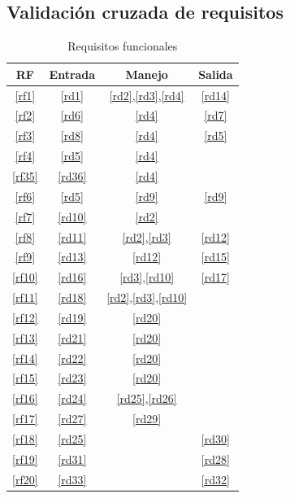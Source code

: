 \documentclass[12pt,a4paper]{article}
\begin{document}
\subsection{Validación cruzada de requisitos}
\begin{table}[H]
\begin{center}
\begin{tabular}{|c|c|c|c|}
\hline
	RF & Entrada & Manejo & Salida\\
\hline
	\ref{rf1} & \ref{rd1} & \ref{rd2},\ref{rd3},\ref{rd4} & \ref{rd14}\\
\hline
	\ref{rf2} & \ref{rd6} & \ref{rd4} & \ref{rd7}\\
\hline
	\ref{rf3} & \ref{rd8} & \ref{rd4} & \ref{rd5}\\
\hline
	\ref{rf4} & \ref{rd5} & \ref{rd4} & \\
\hline
	\ref{rf35} & \ref{rd36} & \ref{rd4} & \\
\hline
	\ref{rf6} & \ref{rd5} & \ref{rd9} & \ref{rd9}\\
\hline
	\ref{rf7} & \ref{rd10} & \ref{rd2} & \\
\hline
	\ref{rf8} & \ref{rd11} & \ref{rd2},\ref{rd3} & \ref{rd12}\\
\hline
	\ref{rf9} & \ref{rd13} & \ref{rd12} & \ref{rd15}\\
\hline
	\ref{rf10} & \ref{rd16} & \ref{rd3},\ref{rd10} & \ref{rd17}\\
\hline
	\ref{rf11} & \ref{rd18} & \ref{rd2},\ref{rd3},\ref{rd10} & \\
\hline
	\ref{rf12} & \ref{rd19} & \ref{rd20} & \\
\hline
	\ref{rf13} & \ref{rd21} & \ref{rd20} & \\
\hline
	\ref{rf14} & \ref{rd22} & \ref{rd20} & \\
\hline
	\ref{rf15} & \ref{rd23} & \ref{rd20} & \\
\hline
	\ref{rf16} & \ref{rd24} & \ref{rd25},\ref{rd26} & \\
\hline
	\ref{rf17} & \ref{rd27} & \ref{rd29} & \\
\hline
	\ref{rf18} & \ref{rd25} &  & \ref{rd30}\\
\hline
	\ref{rf19} & \ref{rd31} &  & \ref{rd28}\\
\hline
	\ref{rf20} & \ref{rd33} &  & \ref{rd32}\\
\hline
\end{tabular}
\end{center}
\caption{Requisitos funcionales}
\end{table}
\end{document}
